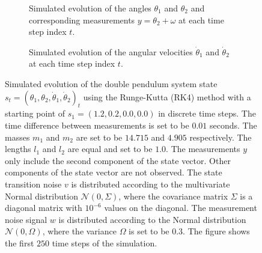 \begin{figure}
  \centering
  \begin{subfigure}[t]{0.475\textwidth}
    \centering
    \caption{Simulated evolution of the angles $\theta_1$ and $\theta_2$ and corresponding measurements $y = \theta_2 + \omega$ at each time step index $t$.
    }
    \label{fig:sim:pendulum_example_angles}
  \end{subfigure}
  \hfill
  \begin{subfigure}[t]{0.475\textwidth}
    \centering
    \caption{Simulated evolution of the angular velocities $\dot{\theta}_1$ and $\dot{\theta}_2$ at each time step index $t$.}
    \label{fig:sim:pendulum_example_velocities}
  \end{subfigure}
  \caption{Simulated evolution of the double pendulum system state $s_t = (\theta_1, \theta_2, \dot{\theta}_1, \dot{\theta}_2)_t$ using the Runge-Kutta (RK4) method with a starting point of $s_1 = (1.2, 0.2, 0.0, 0.0)$ in discrete time steps.
    The time difference between measurements is set to be $0.01$ seconds.
    The masses $m_1$ and $m_2$ are set to be $14.715$ and $4.905$ respectively.
    The lengths $l_1$ and $l_2$ are equal and set to be $1.0$.
    The measurements $y$ only include the second component of the state vector.
    Other components of the state vector are not observed.
    The state transition noise $v$ is distributed according to the multivariate Normal
    distribution $\mathcal{N}(0, \Sigma)$, where the covariance matrix $\Sigma$ is a diagonal
    matrix with $10^{-6}$ values on the diagonal.
    The measurement noise signal $w$ is distributed according to the Normal distribution
    $\mathcal{N}(0, \Omega)$, where the variance $\Omega$ is set to be $0.3$.
    The figure shows the first $250$ time steps of the simulation.
  }
  \label{fig:sim:pendulum_example_states}
\end{figure}


